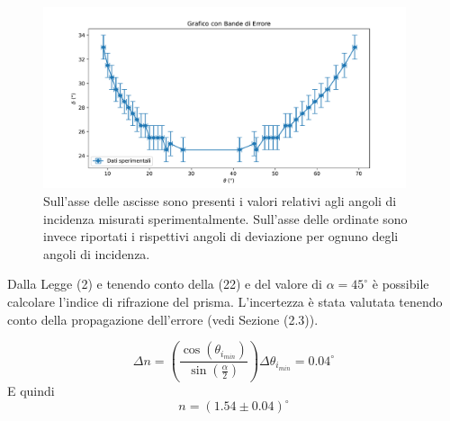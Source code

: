 \begin{figure}[H]
	\centering
	\includegraphics[width=0.95\textwidth]{./figures/grafico1.pdf}
	\captionsetup{width=0.7\linewidth}
	\caption{Sull'asse delle ascisse sono presenti i valori relativi agli angoli di incidenza misurati sperimentalmente. Sull'asse delle ordinate sono invece riportati i rispettivi angoli di deviazione per ognuno degli angoli di incidenza.}
\end{figure}

Dalla Legge (2) e tenendo conto della (22) e del valore di $\alpha=45^{\circ}$ è possibile calcolare l'indice di rifrazione del prisma. L'incertezza è stata valutata tenendo conto della propagazione dell'errore (vedi Sezione (2.3)).

\begin{equation}
	\Delta n=\left(\frac{\cos(\theta_{i_{min}})}{\sin(\frac{\alpha}{2})}\right)\Delta \theta_{i_{min}}=0.04^{\circ}
\end{equation}
E quindi
\begin{equation}
	n = (1.54\pm 0.04)^{\circ}
\end{equation}